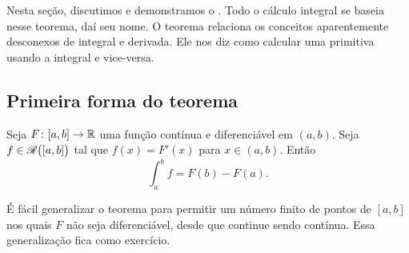 

Nesta seção, discutimos e demonstramos o
\emph{}.
Todo o cálculo integral se baseia nesse teorema, daí seu nome.
O teorema relaciona os conceitos aparentemente desconexos de integral e
derivada. Ele nos diz como calcular uma primitiva usando a integral e
vice-versa.

\subsection{Primeira forma do teorema}

\begin{thm} \label{thm:FTCv1}
Seja $F \colon [a,b] \to {\mathbb{R}}$ uma função contínua e diferenciável
em $(a,b)$. Seja $f \in {\mathscr{R}}\bigl([a,b]\bigr)$ tal que $f(x) = F'(x)$ para
$x \in (a,b)$. Então
\begin{equation*}
\int_a^b f = F(b)-F(a) .
\end{equation*}
\end{thm}

É fácil generalizar o teorema para permitir um número finito de pontos
de $[a,b]$ nos quais $F$ não seja diferenciável, desde que continue sendo
contínua. Essa generalização fica como exercício.

